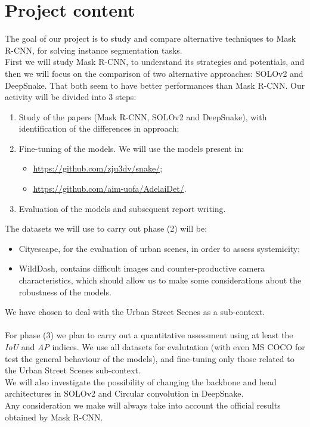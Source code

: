 
\section*{Project content}
The goal of our project is to study and compare alternative techniques to Mask R-CNN, for solving instance segmentation tasks.\\
First we will study Mask R-CNN, to understand its strategies and potentials, and then we will focus on the comparison of two alternative approaches: SOLOv2 and DeepSnake. That both seem to have better performances than Mask R-CNN. Our activity will be divided into 3 steps:
\begin{enumerate}
\item Study of the papers (Mask R-CNN, SOLOv2 and DeepSnake), with identification of the differences in approach;
\item Fine-tuning of the models. We will use the models present in:
\begin{itemize}
\item \url{https://github.com/zju3dv/snake/};
\item \url{https://github.com/aim-uofa/AdelaiDet/}.
\end{itemize}
\noindent
\item Evaluation of the models and subsequent report writing.
\end{enumerate}
\noindent
The datasets we will use to carry out phase (2) will be:
\begin{itemize}
\item Cityescape, for the evaluation of urban scenes, in order to assess systemicity;
\item WildDash, contains difficult images and counter-productive camera characteristics, which should allow us to make some considerations about the robustness of the models.
\end{itemize}
\noindent
We have chosen to deal with the Urban Street Scenes as a sub-context.
\\\\
\noindent
For phase (3) we plan to carry out a quantitative assessment using at least the \textit{IoU} and \textit{AP} indices. We use all datasets for evalutation (with even MS COCO for test the general behaviour of the models), and fine-tuning only those related to the Urban Street Scenes sub-context. \\
We will also investigate the possibility of changing the backbone and head architectures in SOLOv2 and Circular convolution in DeepSnake.\\
Any consideration we make will always take into account the official results obtained by Mask R-CNN.

